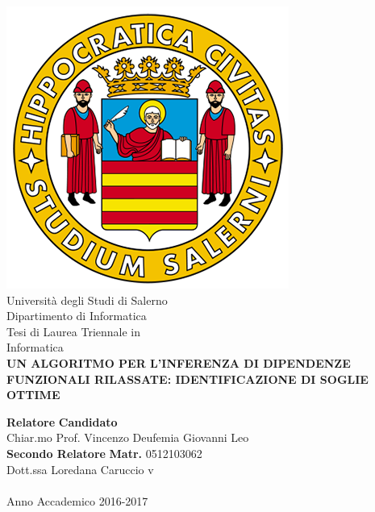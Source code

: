 \begin{center}
    \includegraphics[scale = 0.30]{Immagini/logoUnisa.png}\\
    \vspace{1cm}
    {\Large Università degli Studi di Salerno}\\[0.2truecm]
    {\large Dipartimento di Informatica}\\
    \hrulefill
    \vfill
    {\large Tesi di Laurea Triennale in }\\[0.2truecm]
    {\Large Informatica}\\
    \vfill
    {\large \bf UN ALGORITMO PER L'INFERENZA DI DIPENDENZE 
    FUNZIONALI RILASSATE: IDENTIFICAZIONE DI SOGLIE OTTIME}
    \vfill\vfill
    
    {\bf Relatore} \hfill {\bf Candidato} \\
    Chiar.mo Prof. Vincenzo Deufemia \hfill Giovanni Leo \\
    {\bf Secondo Relatore}
    \hfill\textbf{ Matr.} 0512103062\\
    
    
    Dott.ssa Loredana Caruccio  \hfill {\phantom v} \\
    \vspace{1cm}
    \hrulefill \\
  	\vspace{1cm}
    Anno Accademico 2016-2017
\end{center}
